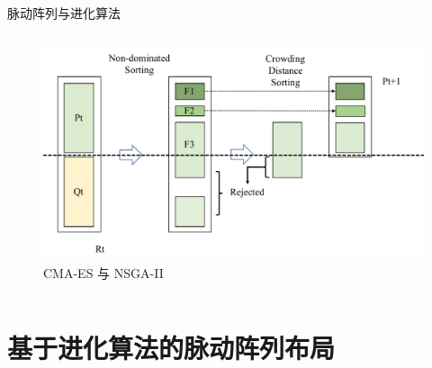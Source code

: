 \documentclass[10pt]{beamer}
\begin{document}
\begin{frame}{脉动阵列与进化算法}
\begin{columns}[T, onlytextwidth]
    \vspace{-0.3cm}
    \begin{figure}
      \includegraphics[width=\textwidth]{img/NSGA-II.pdf}
      \caption{CMA-ES 与 NSGA-II}
    \end{figure}

  \end{columns}

\end{frame}


\section{基于进化算法的脉动阵列布局}
\end{document}
